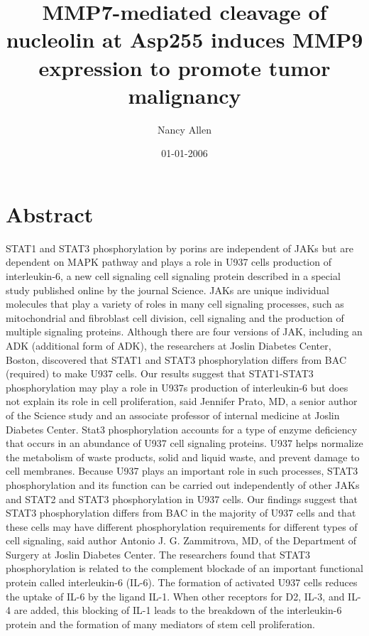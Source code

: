 \documentclass{article}%
\title{MMP7{-}mediated cleavage of nucleolin at Asp255 induces MMP9 expression to promote tumor malignancy}%
\author{Nancy Allen}%
\affil{The Johns Hopkins Oncology Center, Program in Human Genetics, and The Howard Hughes Medical Institute, The Johns Hopkins University School of Medicine, 424 N. Bond Street, Baltimore, 21231, Maryland, USA}%
\date{01{-}01{-}2006}%
\begin{document}
%
\normalsize%
\maketitle%
\section{Abstract}%
\label{sec:Abstract}%
STAT1 and STAT3 phosphorylation by porins are independent of JAKs but are dependent on MAPK pathway and plays a role in U937 cells production of interleukin{-}6, a new cell signaling cell signaling protein described in a special study published online by the journal Science.\newline%
JAKs are unique individual molecules that play a variety of roles in many cell signaling processes, such as mitochondrial and fibroblast cell division, cell signaling and the production of multiple signaling proteins. Although there are four versions of JAK, including an ADK (additional form of ADK), the researchers at Joslin Diabetes Center, Boston, discovered that STAT1 and STAT3 phosphorylation differs from BAC (required) to make U937 cells.\newline%
Our results suggest that STAT1{-}STAT3 phosphorylation may play a role in U937s production of interleukin{-}6 but does not explain its role in cell proliferation, said Jennifer Prato, MD, a senior author of the Science study and an associate professor of internal medicine at Joslin Diabetes Center.\newline%
Stat3 phosphorylation accounts for a type of enzyme deficiency that occurs in an abundance of U937 cell signaling proteins. U937 helps normalize the metabolism of waste products, solid and liquid waste, and prevent damage to cell membranes. Because U937 plays an important role in such processes, STAT3 phosphorylation and its function can be carried out independently of other JAKs and STAT2 and STAT3 phosphorylation in U937 cells.\newline%
Our findings suggest that STAT3 phosphorylation differs from BAC in the majority of U937 cells and that these cells may have different phosphorylation requirements for different types of cell signaling, said author Antonio J. G. Zammitrova, MD, of the Department of Surgery at Joslin Diabetes Center.\newline%
The researchers found that STAT3 phosphorylation is related to the complement blockade of an important functional protein called interleukin{-}6 (IL{-}6). The formation of activated U937 cells reduces the uptake of IL{-}6 by the ligand IL{-}1. When other receptors for D2, IL{-}3, and IL{-}4 are added, this blocking of IL{-}1 leads to the breakdown of the interleukin{-}6 protein and the formation of many mediators of stem cell proliferation.\newline%
\end{document}
